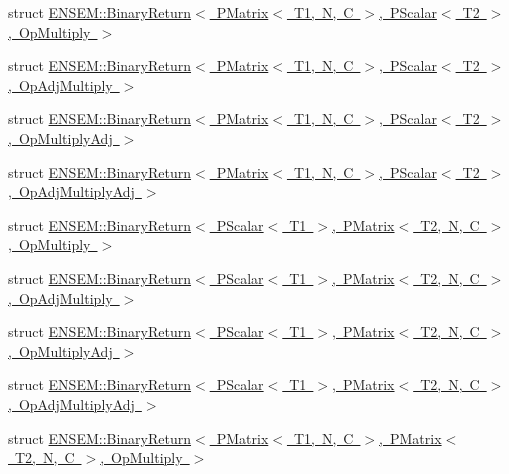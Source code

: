 \begin{DoxyCompactItemize}
\item 
struct \mbox{\hyperlink{structENSEM_1_1BinaryReturn_3_01PMatrix_3_01T1_00_01N_00_01C_01_4_00_01PScalar_3_01T2_01_4_00_01OpMultiply_01_4}{E\+N\+S\+E\+M\+::\+Binary\+Return$<$ P\+Matrix$<$ T1, N, C $>$, P\+Scalar$<$ T2 $>$, Op\+Multiply $>$}}
\item 
struct \mbox{\hyperlink{structENSEM_1_1BinaryReturn_3_01PMatrix_3_01T1_00_01N_00_01C_01_4_00_01PScalar_3_01T2_01_4_00_01OpAdjMultiply_01_4}{E\+N\+S\+E\+M\+::\+Binary\+Return$<$ P\+Matrix$<$ T1, N, C $>$, P\+Scalar$<$ T2 $>$, Op\+Adj\+Multiply $>$}}
\item 
struct \mbox{\hyperlink{structENSEM_1_1BinaryReturn_3_01PMatrix_3_01T1_00_01N_00_01C_01_4_00_01PScalar_3_01T2_01_4_00_01OpMultiplyAdj_01_4}{E\+N\+S\+E\+M\+::\+Binary\+Return$<$ P\+Matrix$<$ T1, N, C $>$, P\+Scalar$<$ T2 $>$, Op\+Multiply\+Adj $>$}}
\item 
struct \mbox{\hyperlink{structENSEM_1_1BinaryReturn_3_01PMatrix_3_01T1_00_01N_00_01C_01_4_00_01PScalar_3_01T2_01_4_00_01OpAdjMultiplyAdj_01_4}{E\+N\+S\+E\+M\+::\+Binary\+Return$<$ P\+Matrix$<$ T1, N, C $>$, P\+Scalar$<$ T2 $>$, Op\+Adj\+Multiply\+Adj $>$}}
\item 
struct \mbox{\hyperlink{structENSEM_1_1BinaryReturn_3_01PScalar_3_01T1_01_4_00_01PMatrix_3_01T2_00_01N_00_01C_01_4_00_01OpMultiply_01_4}{E\+N\+S\+E\+M\+::\+Binary\+Return$<$ P\+Scalar$<$ T1 $>$, P\+Matrix$<$ T2, N, C $>$, Op\+Multiply $>$}}
\item 
struct \mbox{\hyperlink{structENSEM_1_1BinaryReturn_3_01PScalar_3_01T1_01_4_00_01PMatrix_3_01T2_00_01N_00_01C_01_4_00_01OpAdjMultiply_01_4}{E\+N\+S\+E\+M\+::\+Binary\+Return$<$ P\+Scalar$<$ T1 $>$, P\+Matrix$<$ T2, N, C $>$, Op\+Adj\+Multiply $>$}}
\item 
struct \mbox{\hyperlink{structENSEM_1_1BinaryReturn_3_01PScalar_3_01T1_01_4_00_01PMatrix_3_01T2_00_01N_00_01C_01_4_00_01OpMultiplyAdj_01_4}{E\+N\+S\+E\+M\+::\+Binary\+Return$<$ P\+Scalar$<$ T1 $>$, P\+Matrix$<$ T2, N, C $>$, Op\+Multiply\+Adj $>$}}
\item 
struct \mbox{\hyperlink{structENSEM_1_1BinaryReturn_3_01PScalar_3_01T1_01_4_00_01PMatrix_3_01T2_00_01N_00_01C_01_4_00_01OpAdjMultiplyAdj_01_4}{E\+N\+S\+E\+M\+::\+Binary\+Return$<$ P\+Scalar$<$ T1 $>$, P\+Matrix$<$ T2, N, C $>$, Op\+Adj\+Multiply\+Adj $>$}}
\item 
struct \mbox{\hyperlink{structENSEM_1_1BinaryReturn_3_01PMatrix_3_01T1_00_01N_00_01C_01_4_00_01PMatrix_3_01T2_00_01N_00_01C_01_4_00_01OpMultiply_01_4}{E\+N\+S\+E\+M\+::\+Binary\+Return$<$ P\+Matrix$<$ T1, N, C $>$, P\+Matrix$<$ T2, N, C $>$, Op\+Multiply $>$}}

\end{DoxyCompactItemize}
